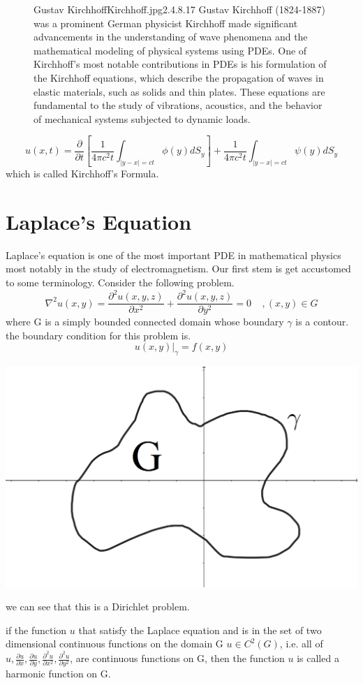 \documentclass[]{article}
\begin{document}
\begin{figure}[b]
    \begin{enrichment}{Gustav Kirchhoff}{Kirchhoff.jpg}{2.4}{.8}{.17}
        Gustav Kirchhoff (1824-1887) was a prominent German physicist
        Kirchhoff made significant advancements in the understanding of wave phenomena and the mathematical modeling of physical systems using PDEs.
        One of Kirchhoff's most notable contributions in PDEs is his formulation of the Kirchhoff equations, which describe the propagation of waves in elastic materials, such as solids and thin plates. These equations are fundamental to the study of vibrations, acoustics, and the behavior of mechanical systems subjected to dynamic loads.
    \end{enrichment}    
\end{figure}
\[
    u(x,t) = \frac{\partial}{\partial t}\left[\frac{1}{4\pi c^2 t}\int_{|y-x|=ct}\phi(y)dS_y\right] + \frac{1}{4\pi c^2 t}\int_{|y-x|=ct}\psi(y)dS_y    
\]
which is called Kirchhoff's Formula.


\section{Laplace's Equation}
Laplace's equation is one of the most important PDE in mathematical physics most notably in the study of electromagnetism. Our first stem is get accustomed to some terminology. Consider the following problem.
\[
    \nabla^2 u(x,y)= \frac{\partial^2 u(x,y,z)}{\partial x^2}+\frac{\partial^2 u(x,y,z)}{\partial y^2} = 0 \;\;\;\; , (x,y) \in G    
\]
where G is a simply bounded connected domain whose boundary $\gamma$ is a contour.
\\
the boundary condition for this problem is.
\[
    u(x,y)|_\gamma = f(x,y)    
\]
\begin{center}
\includegraphics[scale=0.1]{domain.png}
\end{center}
we can see that this is a Dirichlet problem.
\par
if the function $u$ that satisfy the Laplace equation and is in the set of two dimensional continuous functions on the domain G $u \in C^2(G)$, 
i.e. all of $u, \frac{\partial u}{\partial x}, \frac{\partial u}{\partial y}, \frac{\partial^2 u}{\partial x^2},\frac{\partial^2 u}{\partial y^2}$,
are continuous functions on G, then the function $u$ is called a harmonic function on G.
\end{document}
